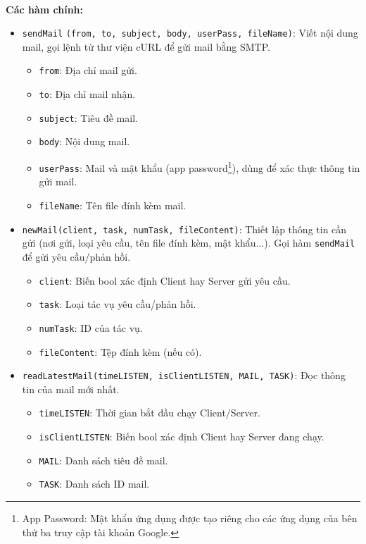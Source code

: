 \paragraph{}{\textbf{Các hàm chính:}}

\begin{itemize}
    \item \texttt{sendMail} \texttt{(from, to, subject, body, userPass, fileName)}: Viết nội dung mail, gọi lệnh từ thư viện cURL để gửi mail bằng SMTP.
    \begin{itemize}
        \item \texttt{from}: Địa chỉ mail gửi.
        \item \texttt{to}: Địa chỉ mail nhận.
        \item \texttt{subject}: Tiêu đề mail.
        \item \texttt{body}: Nội dung mail.
        \item \texttt{userPass}: Mail và mật khẩu (app password\footnote{App Password: Mật khẩu ứng dụng được tạo riêng cho các ứng dụng của bên thứ ba truy cập tài khoản Google.}), dùng để xác thực thông tin gửi mail.
        \item \texttt{fileName}: Tên file đính kèm mail.
    \end{itemize}
        
    \item \texttt{newMail(client, task, numTask, fileContent)}: Thiết lập thông tin cần gửi (nơi gửi, loại yêu cầu, tên file đính kèm, mật khẩu...). Gọi hàm \texttt{sendMail} để gửi yêu cầu/phản hồi.
    \begin{itemize}
        \item \texttt{client}: Biến bool xác định Client hay Server gửi yêu cầu.
        \item \texttt{task}: Loại tác vụ yêu cầu/phản hồi.
        \item \texttt{numTask}: ID của tác vụ.
        \item \texttt{fileContent}: Tệp đính kèm (nếu có).
    \end{itemize}
        
    \item \texttt{readLatestMail(timeLISTEN, isClientLISTEN, MAIL, TASK)}: Đọc thông tin của mail mới nhất.
    \begin{itemize}
        \item \texttt{timeLISTEN}: Thời gian bắt đầu chạy Client/Server.
        \item \texttt{isClientLISTEN}: Biến bool xác định Client hay Server đang chạy.
        \item \texttt{MAIL}: Danh sách tiêu đề mail.
        \item \texttt{TASK}: Danh sách ID mail.
    \end{itemize}
        

\end{itemize}
